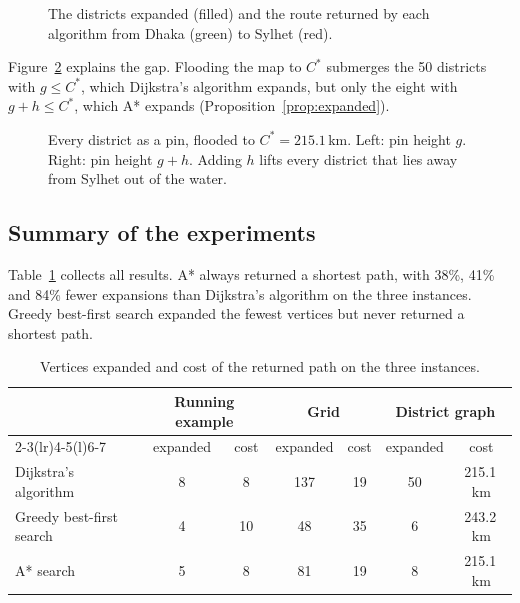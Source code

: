 \begin{figure}[htbp]
  \centering
  
  \caption{The districts expanded (filled) and the route returned by each
    algorithm from Dhaka (green) to Sylhet (red).}\label{fig:map-panels}
\end{figure}

Figure~\ref{fig:water} explains the gap. Flooding the map to $C^{*}$ submerges
the 50 districts with $g \le C^{*}$, which Dijkstra's algorithm expands, but only
the eight with $g + h \le C^{*}$, which A* expands
(Proposition~\ref{prop:expanded}).

\begin{figure}[htbp]
  \centering
  
  \caption{Every district as a pin, flooded to $C^{*} = 215.1$\,km. Left: pin
    height $g$. Right: pin height $g + h$. Adding $h$ lifts every district that
    lies away from Sylhet out of the water.}\label{fig:water}
\end{figure}

\subsection{Summary of the experiments}\label{sec:summary}

Table~\ref{tab:compare-all} collects all results. A* always returned a shortest
path, with 38\%, 41\% and 84\% fewer expansions than Dijkstra's algorithm on
the three instances. Greedy best-first search expanded the fewest vertices but
never returned a shortest path.

\begin{table}[htbp]
  \centering
  \caption{Vertices expanded and cost of the returned path on the three
    instances.}\label{tab:compare-all}
  \begin{tabular}{@{}lcccccc@{}}
    \toprule
     & \multicolumn{2}{c}{Running example} & \multicolumn{2}{c}{Grid}
     & \multicolumn{2}{c}{District graph}\\
    \cmidrule(lr){2-3}\cmidrule(lr){4-5}\cmidrule(l){6-7}
     & expanded & cost & expanded & cost & expanded & cost\\
    \midrule
    Dijkstra's algorithm     & 8 & 8 & 137 & 19 & 50 & 215.1\,km\\
    Greedy best-first search & 4 & \textcolor{cbRed}{10} & 48
      & \textcolor{cbRed}{35} & 6 & \textcolor{cbRed}{243.2\,km}\\
    A* search                & 5 & 8 & 81 & 19 & 8 & 215.1\,km\\
    \bottomrule
  \end{tabular}
\end{table}
